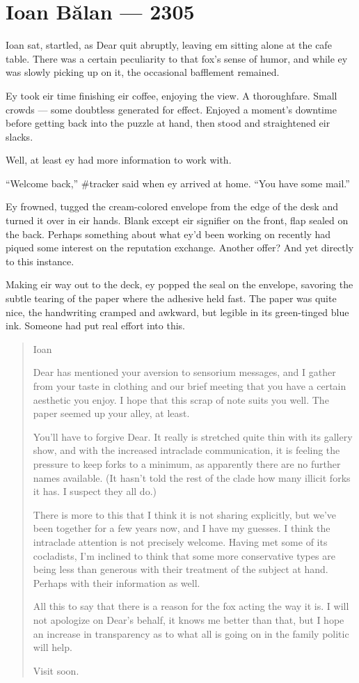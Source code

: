 \hypertarget{ioan-bux103lan-2305}{%
\chapter*{Ioan Bălan — 2305}\label{ioan-bux103lan-2305}}

Ioan sat, startled, as Dear quit abruptly, leaving em sitting alone at the cafe table. There was a certain peculiarity to that fox's sense of humor, and while ey was slowly picking up on it, the occasional bafflement remained.

Ey took eir time finishing eir coffee, enjoying the view. A thoroughfare. Small crowds — some doubtless generated for effect. Enjoyed a moment's downtime before getting back into the puzzle at hand, then stood and straightened eir slacks.

Well, at least ey had more information to work with.

``Welcome back,'' \#tracker said when ey arrived at home. ``You have some mail.''

Ey frowned, tugged the cream-colored envelope from the edge of the desk and turned it over in eir hands. Blank except eir signifier on the front, flap sealed on the back. Perhaps something about what ey'd been working on recently had piqued some interest on the reputation exchange. Another offer? And yet directly to this instance.

Making eir way out to the deck, ey popped the seal on the envelope, savoring the subtle tearing of the paper where the adhesive held fast. The paper was quite nice, the handwriting cramped and awkward, but legible in its green-tinged blue ink. Someone had put real effort into this.

\begin{quote}
Ioan

Dear has mentioned your aversion to sensorium messages, and I gather from your taste in clothing and our brief meeting that you have a certain aesthetic you enjoy. I hope that this scrap of note suits you well. The paper seemed up your alley, at least.

You'll have to forgive Dear. It really is stretched quite thin with its gallery show, and with the increased intraclade communication, it is feeling the pressure to keep forks to a minimum, as apparently there are no further names available. (It hasn't told the rest of the clade how many illicit forks it has. I suspect they all do.)

There is more to this that I think it is not sharing explicitly, but we've been together for a few years now, and I have my guesses. I think the intraclade attention is not precisely welcome. Having met some of its cocladists, I'm inclined to think that some more conservative types are being less than generous with their treatment of the subject at hand. Perhaps with their information as well.

All this to say that there is a reason for the fox acting the way it is. I will not apologize on Dear's behalf, it knows me better than that, but I hope an increase in transparency as to what all is going on in the family politic will help.

Visit soon.
\end{quote}

